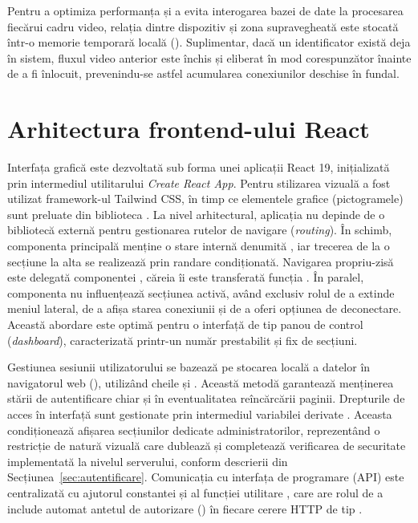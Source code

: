 \documentclass[../../main.tex]{subfiles}
\begin{document}
Pentru a optimiza performanța și a evita interogarea bazei de date la procesarea fiecărui cadru video, relația dintre dispozitiv și zona supravegheată este stocată într-o memorie temporară locală (). Suplimentar, dacă un identificator  există deja în sistem, fluxul video anterior este închis și eliberat în mod corespunzător înainte de a fi înlocuit, prevenindu-se astfel acumularea conexiunilor deschise în fundal.

\section{Arhitectura frontend-ului React}
\label{subsec:fe_arhitectura}

Interfața grafică este dezvoltată sub forma unei aplicații React 19, inițializată prin intermediul utilitarului \textit{Create React App}. Pentru stilizarea vizuală a fost utilizat framework-ul Tailwind CSS, în timp ce elementele grafice (pictogramele) sunt preluate din biblioteca . La nivel arhitectural, aplicația nu depinde de o bibliotecă externă pentru gestionarea rutelor de navigare (\emph{routing}). În schimb, componenta principală  menține o stare internă denumită , iar trecerea de la o secțiune la alta se realizează prin randare condiționată. Navigarea propriu-zisă este delegată componentei , căreia îi este transferată funcția . În paralel, componenta  nu influențează secțiunea activă, având exclusiv rolul de a extinde meniul lateral, de a afișa starea conexiunii și de a oferi opțiunea de deconectare. Această abordare este optimă pentru o interfață de tip panou de control (\emph{dashboard}), caracterizată printr-un număr prestabilit și fix de secțiuni.

Gestiunea sesiunii utilizatorului se bazează pe stocarea locală a datelor în navigatorul web (), utilizând cheile  și . Această metodă garantează menținerea stării de autentificare chiar și în eventualitatea reîncărcării paginii. Drepturile de acces în interfață sunt gestionate prin intermediul variabilei derivate . Aceasta condiționează afișarea secțiunilor dedicate administratorilor, reprezentând o restricție de natură vizuală care dublează și completează verificarea de securitate  implementată la nivelul serverului, conform descrierii din Secțiunea~\ref{sec:autentificare}. Comunicația cu interfața de programare (API) este centralizată cu ajutorul constantei  \linebreak {} și al funcției utilitare , care are rolul de a include automat antetul de autorizare () în fiecare cerere HTTP de tip .
\end{document}
